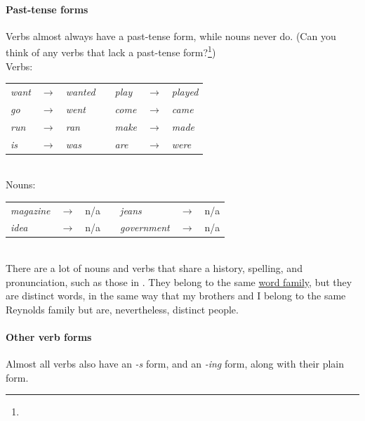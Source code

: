\paragraph*{Past-tense forms}\label{sec:past-forms}
Verbs almost always have a past-tense form, while nouns never do. (Can you think of any verbs that lack a past-tense form?\footnote{
})\\

Verbs:~~
\begin{tabular}{@{} l l l l l l l}
\textit{want} & $\rightarrow$ & \textit{wanted} && \textit{play} & $\rightarrow$ & \textit{played} \\
\textit{go} & $\rightarrow$ & \textit{went} && \textit{come} & $\rightarrow$ & \textit{came} \\
\textit{run} & $\rightarrow$ & \textit{ran} && \textit{make} & $\rightarrow$ & \textit{made} \\
\textit{is} & $\rightarrow$ & \textit{was} && \textit{are} & $\rightarrow$ & \textit{were} \\
\end{tabular}\\

Nouns:~
\begin{tabular}{@{} l l l l l l l}
\textit{magazine} & $\rightarrow$ & n/a && \textit{jeans} & $\rightarrow$ & n/a \\
\textit{idea} & $\rightarrow$ & n/a && \textit{government} & $\rightarrow$ & n/a \\
\end{tabular}\\
There are a lot of nouns and verbs that share a history, spelling, and pronunciation, such as those in . They belong to the same \href{sec:family-lemma-shape-token}{word family}, but they are distinct words, in the same way that my brothers and I belong to the same Reynolds family but are, nevertheless, distinct people.



\paragraph*{Other verb forms}
Almost all verbs also have an \textit{-s} form, and an \textit{-ing} form, along with their plain form.\\

